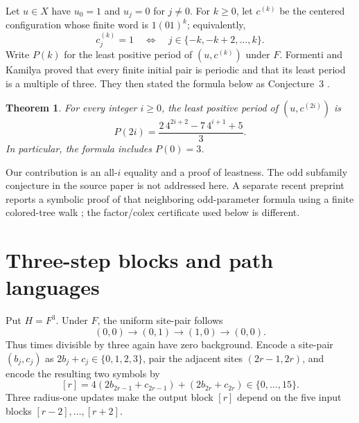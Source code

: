 \documentclass[11pt]{article}
\newtheorem{theorem}{Theorem}
\theoremstyle{remark}
\begin{document}
Let $u\in X$ have $u_0=1$ and $u_j=0$ for $j\neq0$.  For $k\geq0$, let
$c^{(k)}$ be the centered configuration whose finite word is $1(01)^k$;
equivalently,
\[
 c^{(k)}_j=1 \quad\Longleftrightarrow\quad
 j\in\{-k,-k+2,\ldots,k\}.
\]
Write $P(k)$ for the least positive period of $(u,c^{(k)})$ under $F$.
Formenti and Kamilya proved that every finite initial pair is periodic and that
its least period is a multiple of three.  They then stated the formula below as
Conjecture~3 \cite[Sec.~6.3]{FormentiKamilya2026}.

\begin{theorem}\label{thm:main}
For every integer $i\geq0$, the least positive period of
$(u,c^{(2i)})$ is
\[
 P(2i)=\frac{2\,4^{2i+2}-7\,4^{i+1}+5}{3}.
\]
In particular, the formula includes $P(0)=3$.
\end{theorem}

Our contribution is an all-$i$ equality and a proof of leastness.  The odd
subfamily conjecture in the source paper is not addressed here.  A separate
recent preprint reports a symbolic proof of that neighboring odd-parameter
formula using a finite colored-tree walk \cite{Zeng2026SSRN7379379}; the
factor/colex certificate used below is different.

\section{Three-step blocks and path languages}

Put $H=F^3$.  Under $F$, the uniform site-pair follows
\begin{equation}\label{eq:background}
 (0,0)\to(0,1)\to(1,0)\to(0,0).
\end{equation}
Thus times divisible by three again have zero background.  Encode a site-pair
$(b_j,c_j)$ as $2b_j+c_j\in\{0,1,2,3\}$, pair the adjacent sites
$(2r-1,2r)$, and encode the resulting two symbols by
\begin{equation}\label{eq:blockcode}
 [r]=4(2b_{2r-1}+c_{2r-1})+(2b_{2r}+c_{2r})\in\{0,\ldots,15\}.
\end{equation}
Three radius-one updates make the output block $[r]$ depend on the five input
blocks $[r-2],\ldots,[r+2]$.
\end{document}
